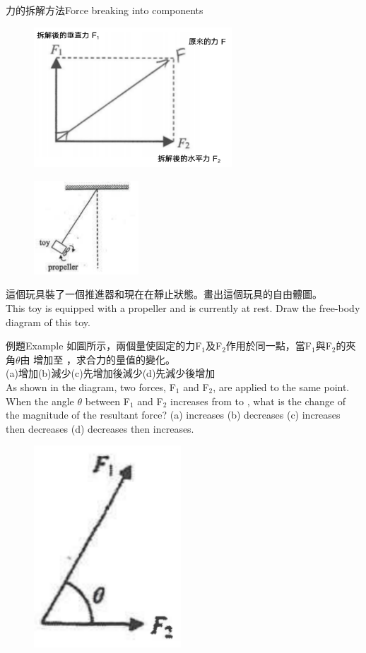 \documentclass[beamer=true]{standalone}
\begin{document}
\begin{frame}{力的拆解方法Force breaking into components}
    \begin{figure}[h!]
        \centering
        \includegraphics[width=0.66\textwidth]{assets/8695f254.png}
    \end{figure}
\end{frame}

\begin{eg}
    \begin{figure}[h!]
        \centering
        \includegraphics[width=0.35\textwidth]{assets/d7d1a80b.png}
    \end{figure}\bigskip\bigskip
    這個玩具裝了一個推進器和現在在靜止狀態。畫出這個玩具的自由體圖。\\This toy is equipped with a propeller and is currently at rest. Draw the free-body diagram of this toy.
\end{eg}

\begin{frame}[t]{例題Example}
    如圖所示，兩個量使固定的力F$_1$及F$_2$作用於同一點，當F$_1$與F$_2$的夾角$\theta$由  增加至 ，求合力的量值的變化。\\(a)增加(b)減少(c)先增加後減少(d)先減少後增加\\As shown in the diagram, two forces, F$_1$ and F$_2$, are applied to the same point. When the angle $\theta$ between F$_1$ and F$_2$ increases from  to , what is the change of the magnitude of the resultant force? (a) increases (b) decreases (c) increases then decreases (d) decreases then increases.
    \begin{figure}[h!]
        \centering
        \includegraphics[width=.22\textwidth]{assets/11bd149b.png}
    \end{figure}
\end{frame}
\end{document}

